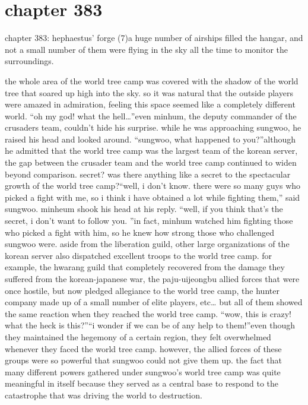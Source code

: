 \section{chapter 383}

chapter 383: hephaestus’ forge (7)a huge number of airships filled the hangar, and not a small number of them were flying in the sky all the time to monitor the surroundings.





the whole area of the world tree camp was covered with the shadow of the world tree that soared up high into the sky.
 so it was natural that the outside players were amazed in admiration, feeling this space seemed like a completely different world.
“oh my god! what the hell…”even minhum, the deputy commander of the crusaders team, couldn’t hide his surprise.
 while he was approaching sungwoo, he raised his head and looked around.
“sungwoo, what happened to you?”although he admitted that the world tree camp was the largest team of the korean server, the gap between the crusader team and the world tree camp continued to widen beyond comparison.
secret? was there anything like a secret to the spectacular growth of the world tree camp?“well, i don’t know.
 there were so many guys who picked a fight with me, so i think i have obtained a lot while fighting them,” said sungwoo.
minheum shook his head at his reply.
“well, if you think that’s the secret, i don’t want to follow you.
”in fact, minhum watched him fighting those who picked a fight with him, so he knew how strong those who challenged sungwoo were.
aside from the liberation guild, other large organizations of the korean server also dispatched excellent troops to the world tree camp.
 for example, the hwarang guild that completely recovered from the damage they suffered from the korean-japanese war, the paju-uijeongbu allied forces that were once hostile, but now pledged allegiance to the world tree camp, the hunter company made up of a small number of elite players, etc…
but all of them showed the same reaction when they reached the world tree camp.
“wow, this is crazy! what the heck is this?”“i wonder if we can be of any help to them!”even though they maintained the hegemony of a certain region, they felt overwhelmed whenever they faced the world tree camp.
however, the allied forces of these groups were so powerful that sungwoo could not give them up.
 the fact that many different powers gathered under sungwoo’s world tree camp was quite meaningful in itself because they served as a central base to respond to the catastrophe that was driving the world to destruction.
